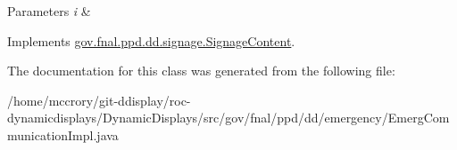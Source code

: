 \begin{DoxyParams}{Parameters}
{\em i} & \\
\hline
\end{DoxyParams}


Implements \hyperlink{interfacegov_1_1fnal_1_1ppd_1_1dd_1_1signage_1_1SignageContent_a59c75e24dcec3ea729297104328a7852}{gov.\-fnal.\-ppd.\-dd.\-signage.\-Signage\-Content}.



The documentation for this class was generated from the following file\-:\begin{DoxyCompactItemize}
\item 
/home/mccrory/git-\/ddisplay/roc-\/dynamicdisplays/\-Dynamic\-Displays/src/gov/fnal/ppd/dd/emergency/Emerg\-Communication\-Impl.\-java\end{DoxyCompactItemize}

